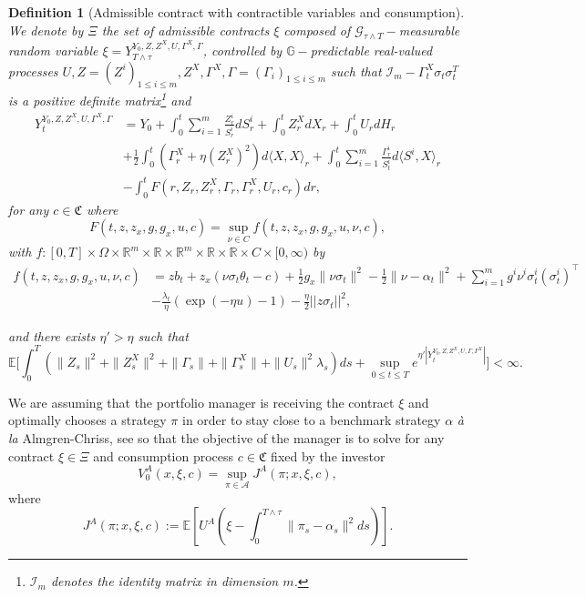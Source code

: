 \documentclass[11pt,a4paper]{article}
\theoremstyle{thmstyleone}%
\theoremstyle{thmstyletwo}%
\theoremstyle{thmstylethree}%
\newtheorem{definition}{Definition}%
\newcommand{\T}{T \wedge \tau}
\begin{document}
\begin{definition}[Admissible contract with contractible variables and consumption] We denote by $\Xi$ the set of admissible contracts $\xi$ composed of $\mathcal G_{\tau\wedge T}-$measurable random variable $\xi=Y_{T\wedge \tau}^{Y_0,Z,Z^X,U,\Gamma^X,\Gamma}$, controlled by $\mathbb G-$predictable real-valued processes $U,Z=(Z^i)_{1\leq i\leq m},Z^X,\Gamma^X,\Gamma=(\Gamma_i)_{1\leq i\leq m}$ such that $\mathcal{I}_m - \Gamma^X_t \sigma_t \sigma^T_t$ is a positive definite matrix\footnote{$\mathcal{I}_m$ denotes the identity matrix in dimension $m$.} and
    \begin{align*}
   Y_t^{Y_0,Z,Z^X,U,\Gamma^X,\Gamma}&= Y_0+ \int_{0}^{t}\sum_{i=1}^m \frac{Z^i_r}{S^i_r} dS^i_r + \int_{0 }^{t} Z_r^X dX_r + \int_{0}^{t} U_r dH_r \\
    &+ \frac{1}{2}\int_{0}^{t} (\Gamma_r^X + \eta (Z_r^X)^2 ) d\langle X, X\rangle_r + \int_{0}^{t} \sum_{i=1}^m \frac{\Gamma_r^i}{S^i_t} d\langle S^i, X\rangle_r\\
    &- \int_{0}^{t} F(r, Z_r, Z_r^X, \Gamma_r, \Gamma_r^X, U_r,c_r) dr,
\end{align*}
for any $c\in\mathfrak C$ where \[ F(t, z, z_x, g, g_x, u,c)=\sup_{\nu\in C} f(t,z,z_x,g,g_x,u,\nu,c),\] with $f:[0,T]\times\Omega\times \mathbb R^m\times\mathbb R\times \mathbb R^m\times\mathbb R\times \mathbb R\times C\times [0,\infty)$ by
\begin{align*} f(t,z,z_x,g,g_x,u,\nu,c)&= z b_t +z_x(\nu \sigma_t \theta_t-c)+ \frac{1}{2} g_x\| \nu\sigma_t\|^2 - \frac{1}{2}\|\nu - \alpha_t\|^2 +\sum_{i=1}^m g^i \nu^i \sigma_t^i(\sigma_t^i)^\top\\
&- \frac{\lambda_t}{\eta} (\exp{(-\eta u) - 1})- \frac{\eta}{2}||z \sigma_t||^2,\end{align*}
 
and there exists $\eta'>\eta$ such that   \[\mathbb E\Big[\int_0^T (\|Z_s\|^2+\|Z^X_s\|^2+\|\Gamma_s\|+\|\Gamma^X_s\| +\|U_s\|^2\lambda_s) ds + \sup_{0\leq t\leq T} e^{\eta'|Y_t^{Y_0,Z,Z^X,U,\Gamma,\Gamma^X}|}\Big]<\infty.\]

   \end{definition}

  
We are assuming that the portfolio manager is receiving the contract $\xi$ and optimally chooses a strategy $\pi$ in order to stay close to a benchmark strategy $\alpha$ \textit{\`a la} Almgren-Chriss, see \cite{almgren2001optimal} so that the objective of the manager is to solve for any contract $\xi\in \Xi$ and consumption process $c\in \mathfrak C$ fixed by the investor
\begin{equation}\label{pbAgent-Appendix}  \tag{A} V^A_0(x,\xi,c)=\sup_{\pi\in \mathcal A} J^A(\pi;x,\xi,c),\end{equation}
where
\[J^A(\pi;x,\xi,c):=\mathbb E[ U^A(\xi- \int_{0}^{\T} \|\pi_s - \alpha_s\|^2 ds)].\]
\end{document}
